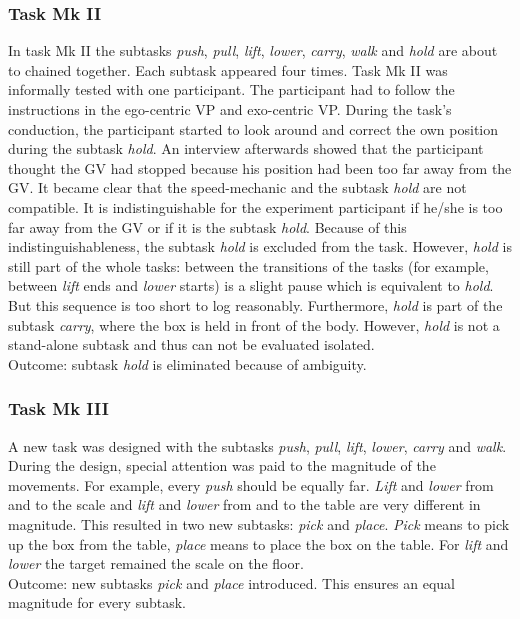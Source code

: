 \subsubsection{Task Mk II}
In task Mk II the subtasks \textit{push}, \textit{pull}, \textit{lift}, \textit{lower}, \textit{carry}, \textit{walk} and \textit{hold} are about to chained together. Each subtask appeared four times. Task Mk II was informally tested with one participant. The participant had to follow the instructions in the ego-centric VP and exo-centric VP. During the task's conduction, the participant started to look around and correct the own position during the subtask \textit{hold}. An interview afterwards showed that the participant thought the GV had stopped because his position had been too far away from the GV. It became clear that the speed-mechanic and the subtask \textit{hold} are not compatible. It is indistinguishable for the experiment participant if he/she is too far away from the GV or if it is the subtask \textit{hold}. Because of this indistinguishableness, the subtask \textit{hold} is excluded from the task. However, \textit{hold} is still part of the whole tasks: between the transitions of the tasks (for example, between \textit{lift} ends and \textit{lower} starts) is a slight pause which is equivalent to \textit{hold}. But this sequence is too short to log reasonably. Furthermore, \textit{hold} is part of the subtask \textit{carry}, where the box is held in front of the body. However, \textit{hold} is not a stand-alone subtask and thus can not be evaluated isolated.\\
Outcome: subtask \textit{hold} is eliminated because of ambiguity.

\subsubsection{Task Mk III}
A new task was designed with the subtasks \textit{push}, \textit{pull}, \textit{lift}, \textit{lower}, \textit{carry} and \textit{walk}. During the design, special attention was paid to the magnitude of the movements. For example, every \textit{push} should be equally far. \textit{Lift} and \textit{lower} from and to the scale and \textit{lift} and \textit{lower} from and to the table are very different in magnitude. This resulted in two new subtasks: \textit{pick} and \textit{place}. \textit{Pick} means to pick up the box from the table, \textit{place} means to place the box on the table. For \textit{lift} and \textit{lower} the target remained the scale on the floor.\\
Outcome: new subtasks \textit{pick} and \textit{place} introduced. This ensures an equal magnitude for every subtask.

